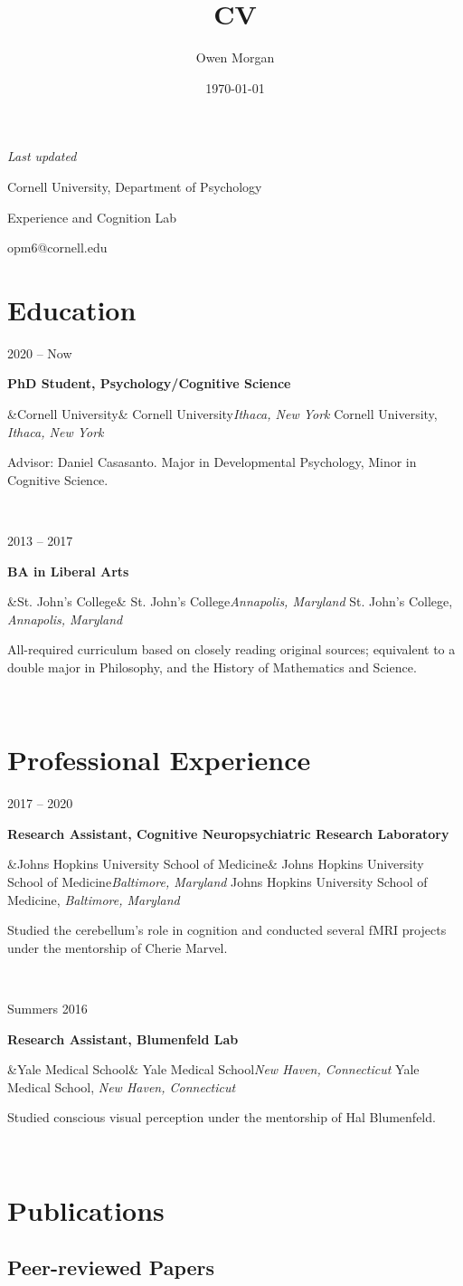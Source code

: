 \documentclass{article}
\author{Owen Morgan}
\title{CV}
\date{\today}
\makeatletter
\newcommand{\entry}[5]{

  \begin{minipage}[t]{.15\textwidth}
    \begin{flushright}
      \hfill {#1}
    \end{flushright}
  \end{minipage}
  \hfill\vline\hfill
  \begin{minipage}[t]{.80\textwidth}
    \textbf{#2}

    \ifx&#3&
      {#3}\textit{#4}
    \else
      {#3, }\textit{#4}

    \fi
    \footnotesize{#5}
  \end{minipage}\\\vspace{.25cm}
}
\newcommand{\cu}{Cornell University}
\newcommand{\sjc}{St. John's College}
\newcommand{\jhusom}{Johns Hopkins University School of Medicine}
\renewcommand{\maketitle}{
  \begin{minipage}[t]{.5\textwidth}
    \begin{flushleft}
      \textit{Last updated \thedate}
    \end{flushleft}
  \end{minipage}
  \begin{minipage}[t]{.5\textwidth}
    \begin{flushright}
      {\huge\bfseries
      \theauthor}

      \vspace{.25em}

      \cu, Department of Psychology

      Experience and Cognition Lab

      opm6@cornell.edu

    \end{flushright}
  \end{minipage}
}
\makeatother
\begin{document}
\maketitle

\section{Education}

\entry
{2020 -- Now}
{PhD Student, Psychology/Cognitive Science}
{\cu}{Ithaca, New York}
{Advisor: Daniel Casasanto. Major in Developmental Psychology, Minor in Cognitive Science.}

\entry
{2013 -- 2017}
{BA in Liberal Arts}
{\sjc}{Annapolis, Maryland}
{All-required curriculum based on closely reading original sources; equivalent to a double major in Philosophy, and the History of Mathematics and Science.}

\section{Professional Experience}

\entry
{2017 -- 2020}
{Research Assistant, Cognitive Neuropsychiatric Research Laboratory}
{\jhusom}{Baltimore, Maryland}
{Studied the cerebellum’s role in cognition and conducted several fMRI projects under the mentorship of Cherie Marvel.}

\entry
{Summers 2016 }
{Research Assistant, Blumenfeld Lab}
{Yale Medical School}{New Haven, Connecticut}
{Studied conscious visual perception under the mentorship of Hal Blumenfeld.}

\section{Publications}



\subsection{Peer-reviewed Papers}
\newrefsection[pubs]
\nocite{*}
\printbibliography[heading=none]
\end{document}
